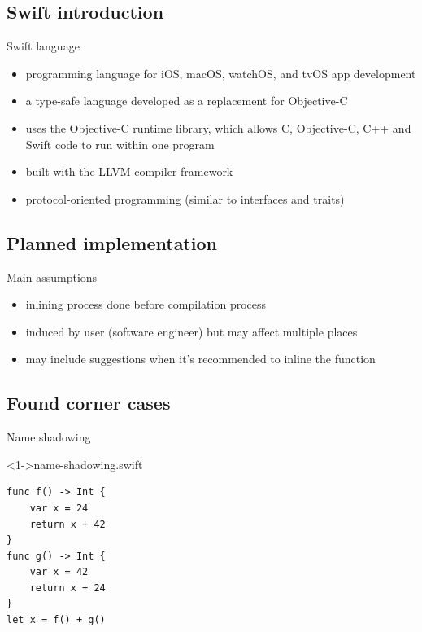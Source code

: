 \documentclass[hyperref={pdfpagelabels=false},xcolor={dvipsnames},compress,table,usenames,dvipsnames]{beamer}
\begin{document}
    \subsection{Swift introduction}

    \begin{frame}[fragile]{Swift language}
        \begin{itemize}
            \item programming language for iOS, macOS, watchOS, and tvOS app development\pause
            \item a type-safe language developed as a replacement for Objective-C\pause
            \item uses the Objective-C runtime library, which allows C, Objective-C, C++ and Swift code to run within one program\pause
            \item built with the LLVM compiler framework\pause
            \item protocol-oriented programming (similar to interfaces and traits)
        \end{itemize}
    \end{frame}

    \subsection{Planned implementation}

    \begin{frame}[fragile]{Main assumptions}
        \begin{itemize}
            \item inlining process done before compilation process\pause
            \item induced by user (software engineer) but may affect multiple places\pause
            \item may include suggestions when it's recommended to inline the function
        \end{itemize}
    \end{frame}

    \subsection{Found corner cases}

    \begin{frame}[fragile]{Name shadowing}
        \begin{exampleblock}
            <1->{name-shadowing.swift}
            \begin{lstlisting}
func f() -> Int {
    var x = 24
    return x + 42
}
func g() -> Int {
    var x = 42
    return x + 24
}
let x = f() + g()
            \end{lstlisting}
        \end{exampleblock}
    \end{frame}
\end{document}
